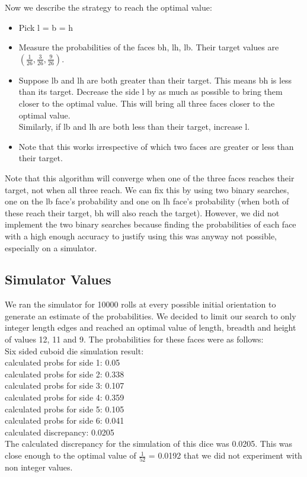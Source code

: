 Now we describe the strategy to reach the optimal value:\\
\begin{itemize}
    \item Pick l = b = h\\
    \item Measure the probabilities of the faces bh, lh, lb. Their target values are $(\frac{1}{26}, \frac{3}{26}, \frac{9}{26})$.\\
    \item Suppose lb and lh are both greater than their target. This means bh is less than its target. Decrease the side l by as much as possible to bring them closer to the optimal value. This will bring all three faces closer to the optimal value.\\
    Similarly, if lb and lh are both less than their target, increase l.\\
    \item Note that this works irrespective of which two faces are greater or less than their target.\\

\end{itemize}

Note that this algorithm will converge when one of the three faces reaches their target, not when all three reach. We can fix this by using two binary searches, one on the lb face's probability and one on lh face's probability (when both of these reach their target, bh will also reach the target). However, we did not implement the two binary searches because finding the probabilities of each face with a high enough accuracy to justify using this was anyway not possible, especially on a simulator.\\

\subsection{Simulator Values}
We ran the simulator for 10000 rolls at every possible initial orientation to generate an estimate of the probabilities. We decided to limit our search to only integer length edges and reached an optimal value of length, breadth and height of values 12, 11 and 9. The probabilities for these faces were as follows:\\
Six sided cuboid die simulation result:\\
calculated probs for side 1: 0.05 \\
calculated probs for side 2: 0.338 \\
calculated probs for side 3: 0.107 \\
calculated probs for side 4: 0.359 \\
calculated probs for side 5: 0.105 \\
calculated probs for side 6: 0.041\\
calculated discrepancy: 0.0205\\
The calculated discrepancy for the simulation of this dice was 0.0205. This was close enough to the optimal value of $\frac{1}{52}$ = 0.0192 that we did not experiment with non integer values.\\
